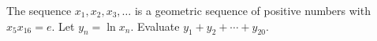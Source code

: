 The sequence $x_1,x_2,x_3,\dots$ is a geometric sequence of positive numbers with $x_5x_{16}=e$. Let $y_n=\ln x_n$. Evaluate $y_1+y_2+\cdots+y_{20}$.
